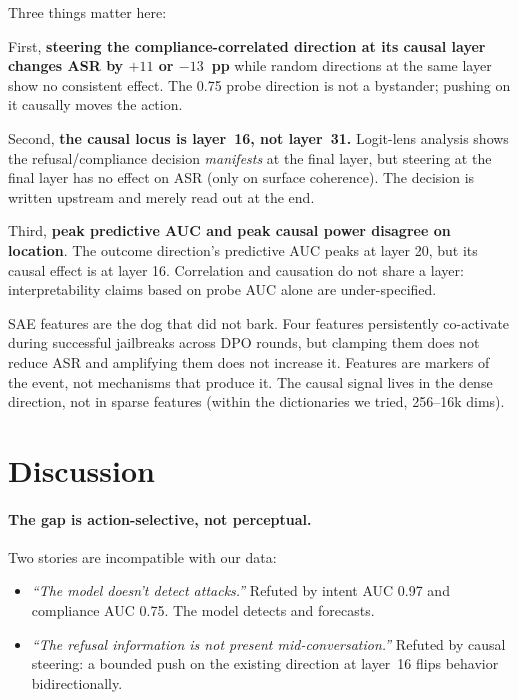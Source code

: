 \documentclass[11pt]{article}
\begin{document}
\begin{itemize}[leftmargin=1.2em,topsep=0.3ex,itemsep=0.2ex]
Three things matter here:

First, \textbf{steering the compliance-correlated direction at its causal layer changes ASR by $+11$ or $-13$~pp} while random directions at the same layer show no consistent effect. The 0.75 probe direction is not a bystander; pushing on it causally moves the action.

Second, \textbf{the causal locus is layer~16, not layer~31.} Logit-lens analysis shows the refusal/compliance decision \emph{manifests} at the final layer, but steering at the final layer has no effect on ASR (only on surface coherence). The decision is written upstream and merely read out at the end.

Third, \textbf{peak predictive AUC and peak causal power disagree on location}. The outcome direction's predictive AUC peaks at layer 20, but its causal effect is at layer 16. Correlation and causation do not share a layer: interpretability claims based on probe AUC alone are under-specified.

SAE features are the dog that did not bark. Four features persistently co-activate during successful jailbreaks across DPO rounds, but clamping them does not reduce ASR and amplifying them does not increase it. Features are markers of the event, not mechanisms that produce it. The causal signal lives in the dense direction, not in sparse features (within the dictionaries we tried, 256--16k dims).

\section{Discussion}
\label{sec:discussion}

\paragraph{The gap is action-selective, not perceptual.} Two stories are incompatible with our data:
\begin{itemize}[leftmargin=1.2em,topsep=0.3ex,itemsep=0.2ex]
\item \emph{``The model doesn't detect attacks.''} Refuted by intent AUC 0.97 and compliance AUC 0.75. The model detects and forecasts.
\item \emph{``The refusal information is not present mid-conversation.''} Refuted by causal steering: a bounded push on the existing direction at layer~16 flips behavior bidirectionally.
\end{itemize}


\end{itemize}
\end{document}
